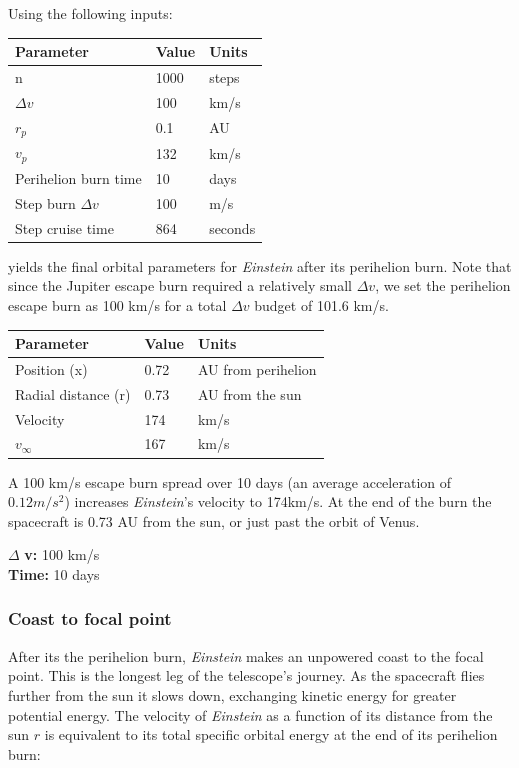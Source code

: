 \documentclass[12pt]{article} %
\begin{document}
Using the following inputs:

\begin{center}
\begin{tabular}{|m{4 cm}| m{4 cm}| m{4 cm}|} \hline
\textbf{Parameter} & \textbf{Value} & \textbf{Units}\\ \hline
n & 1000& steps\\ \hline
$\Delta v$ & 100& km/s \\ \hline
$r_p$      &  0.1& AU\\ \hline
$v_p$     &  132 & km/s\\ \hline
Perihelion burn time & 10 & days \\ \hline
Step burn $\Delta v$ & 100 & m/s\\ \hline
Step cruise time & 864& seconds \\ \hline
\end{tabular}
\end{center}

yields the final orbital parameters for \textit{Einstein} after its perihelion burn. Note that since the Jupiter escape burn required a relatively small $\Delta v$, we set the perihelion escape burn as 100 km/s for a total $\Delta v$ budget of 101.6 km/s. 

\begin{center}
\begin{tabular}{|m{4 cm}| m{4 cm}| m{4 cm}|} \hline
\textbf{Parameter} & \textbf{Value} & \textbf{Units}\\ \hline
Position (x) & 0.72 & AU from perihelion\\ \hline
Radial distance (r) & 0.73& AU from the sun\\ \hline
Velocity      &  174 & km/s\\ \hline
$v_{\infty}$     &  167& km/s\\ \hline
\end{tabular}
\end{center}

A 100 km/s escape burn spread over 10 days (an average acceleration of $0.12m/s^2$) increases \textit{Einstein}'s velocity to 174km/s. At the end of the burn the spacecraft is 0.73 AU from the sun, or just past the orbit of Venus.


$\Delta$ \textbf{v:} 100 km/s\\
\textbf{Time:} 10 days\\

\subsubsection{Coast to focal point}
After its the perihelion burn, \textit{Einstein} makes an unpowered coast to the focal point. This is the longest leg of the telescope's journey. As the spacecraft flies further from the sun it slows down, exchanging kinetic energy for greater potential energy. The velocity of \textit{Einstein} as a function of its distance from the sun $r$ is equivalent to its total specific orbital energy at the end of its perihelion burn:
\end{document}
